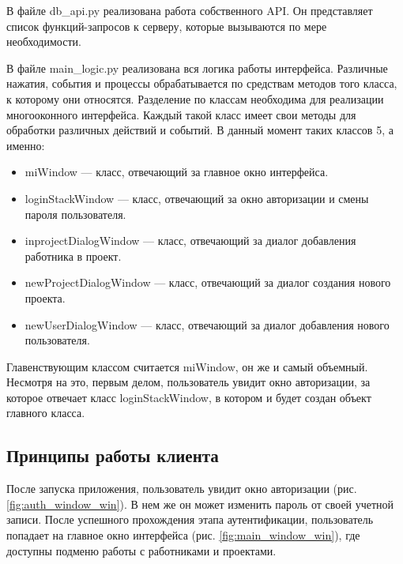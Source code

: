 В файле db\_api.py реализована работа собственного API. Он представляет список функций-запросов к серверу, которые вызываются по мере необходимости.





В файле main\_logic.py реализована вся логика работы интерфейса. Различные нажатия, события и процессы обрабатывается по средствам методов того класса, к которому они относятся. Разделение по классам необходима для реализации многооконного интерфейса. Каждый такой класс имеет свои методы для обработки различных действий и событий. В данный момент таких классов 5, а именно:
\begin{itemize}
    \item miWindow --- класс, отвечающий за главное окно интерфейса.
    \item loginStackWindow --- класс, отвечающий за окно авторизации и смены пароля пользователя.
    \item inprojectDialogWindow --- класс, отвечающий за диалог добавления работника в проект.
    \item newProjectDialogWindow --- класс, отвечающий за диалог создания нового проекта.
    \item newUserDialogWindow --- класс, отвечающий за диалог добавления нового пользователя.
\end{itemize}

Главенствующим классом считается miWindow, он же и самый объемный. Несмотря на это, первым делом, пользователь увидит окно авторизации, за которое отвечает класс loginStackWindow, в котором и будет создан объект главного класса.


\clearpage
\subsection{Принципы работы клиента}
После запуска приложения, пользователь увидит окно авторизации (рис. \ref{fig:auth_window_win}). В нем же он может изменить пароль от своей учетной записи. После успешного прохождения этапа аутентификации, пользователь попадает на главное окно интерфейса (рис. \ref{fig:main_window_win}), где доступны подменю работы с работниками и проектами.

